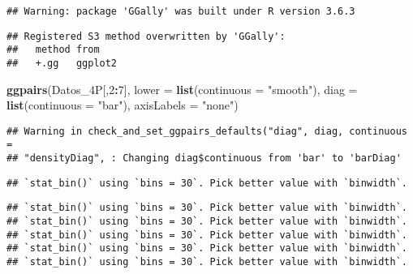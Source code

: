 \documentclass[
]{article}
\newenvironment{Shaded}{\begin{snugshade}}{\end{snugshade}}
\newcommand{\CommentTok}[1]{\textcolor[rgb]{0.56,0.35,0.01}{\textit{#1}}}
\newcommand{\DataTypeTok}[1]{\textcolor[rgb]{0.13,0.29,0.53}{#1}}
\newcommand{\DecValTok}[1]{\textcolor[rgb]{0.00,0.00,0.81}{#1}}
\newcommand{\FloatTok}[1]{\textcolor[rgb]{0.00,0.00,0.81}{#1}}
\newcommand{\KeywordTok}[1]{\textcolor[rgb]{0.13,0.29,0.53}{\textbf{#1}}}
\newcommand{\NormalTok}[1]{#1}
\newcommand{\OperatorTok}[1]{\textcolor[rgb]{0.81,0.36,0.00}{\textbf{#1}}}
\newcommand{\StringTok}[1]{\textcolor[rgb]{0.31,0.60,0.02}{#1}}
\begin{document}
\begin{verbatim}
## Warning: package 'GGally' was built under R version 3.6.3
\end{verbatim}

\begin{verbatim}
## Registered S3 method overwritten by 'GGally':
##   method from   
##   +.gg   ggplot2
\end{verbatim}

\begin{Shaded}
\begin{Highlighting}[]
\KeywordTok{ggpairs}\NormalTok{(Datos_4P[,}\DecValTok{2}\OperatorTok{:}\DecValTok{7}\NormalTok{], }\DataTypeTok{lower =} \KeywordTok{list}\NormalTok{(}\DataTypeTok{continuous =} \StringTok{"smooth"}\NormalTok{),}
        \DataTypeTok{diag =} \KeywordTok{list}\NormalTok{(}\DataTypeTok{continuous =} \StringTok{"bar"}\NormalTok{), }\DataTypeTok{axisLabels =} \StringTok{"none"}\NormalTok{)}
\end{Highlighting}
\end{Shaded}

\begin{verbatim}
## Warning in check_and_set_ggpairs_defaults("diag", diag, continuous =
## "densityDiag", : Changing diag$continuous from 'bar' to 'barDiag'
\end{verbatim}

\begin{verbatim}
## `stat_bin()` using `bins = 30`. Pick better value with `binwidth`.
\end{verbatim}

\begin{verbatim}
## `stat_bin()` using `bins = 30`. Pick better value with `binwidth`.
## `stat_bin()` using `bins = 30`. Pick better value with `binwidth`.
## `stat_bin()` using `bins = 30`. Pick better value with `binwidth`.
## `stat_bin()` using `bins = 30`. Pick better value with `binwidth`.
## `stat_bin()` using `bins = 30`. Pick better value with `binwidth`.
\end{verbatim}

\begin{Shaded}
\end{Shaded}
\end{document}
